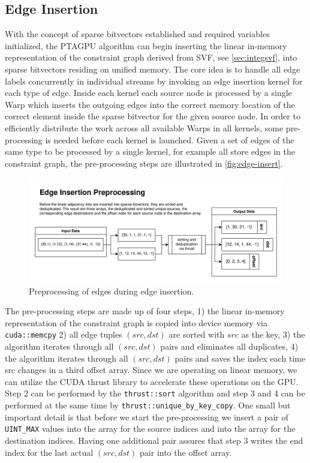 \subsection{Edge Insertion}
With the concept of sparse bitvectors established and required variables initialized, the PTAGPU algorithm can begin inserting the linear in-memory representation of the constraint graph derived from SVF, see \autoref{sec:integsvf}, into sparse bitvectors residing on unified memory.
The core idea is to handle all edge labels concurrently in individual streams by invoking an edge insertion kernel for each type of edge.
Inside each kernel each source node is processed by a single Warp which inserts the outgoing edges into the correct memory location of the correct element inside the sparse bitvector for the given source node.
In order to efficiently distribute the work across all available Warps in all kernels, some pre-processing is needed before each kernel is launched.
Given a set of edges of the same type to be processed by a single kernel, for example all store edges in the constraint graph, the pre-processing steps are illustrated in \autoref{fig:edge-insert}.
\begin{figure}
    \centering
    \includegraphics[width=1.\textwidth]{img/edge-insertion.png}
    \caption[Diagram for Edge Insertion]{Preprocessing of edges during edge insertion.}
    \label{fig:edge-insert}
\end{figure}
The pre-processing steps are made up of four steps, 1) the linear in-memory representation of the constraint graph is copied into device memory via \verb|cuda::memcpy| 2) all edge tuples $(src,dst)$ are sorted with $src$ as the key, 3) the algorithm iterates through all $(src,dst)$ pairs and eliminates all duplicates, 4) the algorithm iterates through all $(src,dst)$ pairs and saves the index each time src changes in a third offset array.
Since we are operating on linear memory, we can utilize the CUDA thrust library to accelerate these operations on the GPU.
Step 2 can be performed by the \verb|thrust::sort| algorithm and step 3 and 4 can be performed at the same time by \verb|thrust::unique_by_key_copy|.
One small but important detail is that before we start the pre-processing we insert a pair of \verb|UINT_MAX| values into the array for the source indices and into the array for the destination indices.
Having one additional pair assures that step 3 writes the end index for the last actual $(src,dst)$ pair into the offset array.

